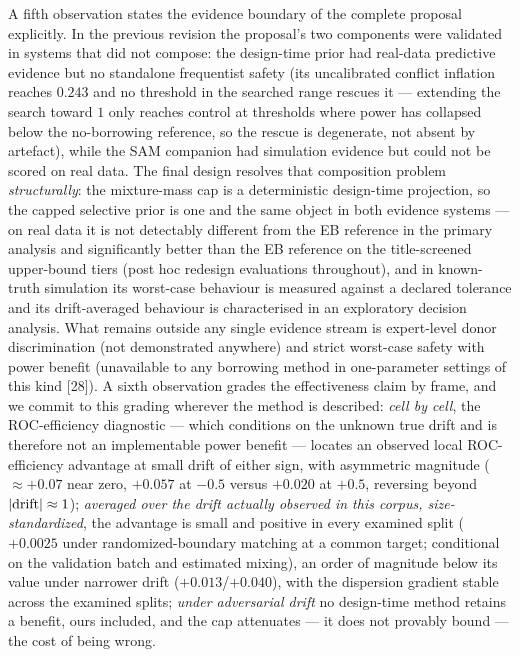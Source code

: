 \documentclass[11pt]{article}
\begin{document}
A fifth observation states the evidence boundary of the complete proposal
explicitly. In the previous revision the proposal's two components were
validated in systems that did not compose: the design-time prior had
real-data predictive evidence but no standalone frequentist safety (its
uncalibrated conflict inflation reaches $0.243$ and no threshold in the
searched range rescues it --- extending the search toward $1$ only reaches
control at thresholds where power has collapsed below the no-borrowing
reference, so the rescue is degenerate, not absent by artefact), while the
SAM companion had simulation evidence but could not be scored on real data.
The final design resolves that composition problem \emph{structurally}: the
mixture-mass cap is a deterministic design-time projection, so the capped
selective prior is one and the same object in both evidence systems --- on
real data it is not detectably different from the EB reference in the
primary analysis and
significantly better
than the EB reference on the title-screened upper-bound tiers (post hoc
redesign evaluations throughout), and in
known-truth simulation its worst-case behaviour is measured against a
declared tolerance and its drift-averaged behaviour is characterised in an
exploratory decision analysis. What
remains outside any single evidence stream is expert-level donor
discrimination (not demonstrated anywhere) and strict worst-case safety
with power benefit (unavailable to any borrowing method in one-parameter
settings of this kind [28]). A sixth
observation grades the effectiveness claim by frame, and we commit to this
grading wherever the method is described: \emph{cell by cell}, the
ROC-efficiency diagnostic --- which conditions on the unknown true drift
and is therefore not an implementable power benefit --- locates an
observed local ROC-efficiency advantage at small drift of either sign,
with asymmetric magnitude ($\approx +0.07$ near zero, $+0.057$ at $-0.5$
versus $+0.020$ at $+0.5$, reversing beyond
$|{\rm drift}| \approx 1$); \emph{averaged over the drift actually
observed in this corpus, size-standardized}, the advantage is small
and positive in every examined split ($+0.0025$ under
randomized-boundary matching at a common target; conditional on the
validation batch and estimated mixing), an order of magnitude below
its value under
narrower drift ($+0.013$/$+0.040$), with the
dispersion gradient stable across the examined splits; \emph{under adversarial
drift} no design-time method retains a benefit, ours included, and the cap
attenuates --- it does not provably bound --- the cost
of being wrong.
\end{document}

